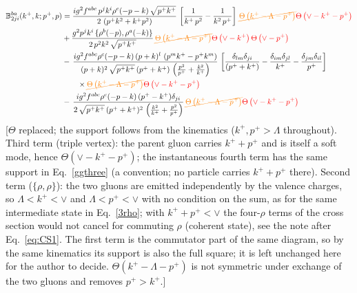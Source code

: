 \documentclass[aps,prd,amsmath,amssymb,nofootinbib]{revtex4-2}
\def\mf#1{\mathbb{#1}}
\numberwithin{equation}{section}
\begin{document}
\begin{align}
    \mf{B}^{ba}_{2ji}(k^{+},k;p^{+},p) & =  \frac{ig^{2}f^{abc}\,p^{j}k^{i}\rho^{c}(-p-k)\, \sqrt{p^{+}k^{+}}}{2\,\left(p^{+}k^{2}+k^{+}p^{2}\right)}\,\left[\frac{1}{k^{+}\,p^{2}} - \frac{1}{k^{2}\,p^{+}}\right]\,{\color{orange}\cancel{\Theta\left(k^{+}-\Lambda-p^{+}\right)}}{\color{red}\Theta\left(\vee-k^{+}-p^{+}\right)}\notag \\ & + \frac{g^{2}p^{j}k^{i}\,\{\rho^{b}(-p),\rho^{a}(-k)\}}{2\,p^{2}k^{2}\, \sqrt{p^{+}k^{+}}}\,{\color{orange}\cancel{\Theta\left(k^{+}-\Lambda-p^{+}\right)}}{\color{red}\Theta\left(\vee-k^{+}\right)\Theta\left(\vee-p^{+}\right)}\notag \\ & -\,\frac{ig^{2}f^{abc}\rho^{c}(-p-k)\,(p+k)^{l}\,\left(p^{m}k^{+}-p^{+}k^{m}\right)}{(p+k)^{2}\,\sqrt{p^{+}k^{+}}\,(p^{+}+k^{+})\,\left(\frac{p^{2}}{p^{+}}+\frac{k^{2}}{k^{+}}\right)}\,\left[\frac{\delta_{lm}\delta_{ji}}{(p^{+}+k^{+})} - \frac{\delta_{im}\delta_{jl}}{k^{+}} - \frac{\delta_{jm}\delta_{il}}{p^{+}}\right]\notag \\ & \qquad\times{\color{orange}\cancel{\Theta\left(k^{+}-\Lambda-p^{+}\right)}}{\color{red}\Theta\left(\vee-k^{+}-p^{+}\right)}\notag \\ & -\,\frac{ig^{2}f^{abc}\rho^{c}(-p-k)\,(p^{+}-k^{+})\delta_{ji}}{2\,\sqrt{p^{+}k^{+}}\,(p^{+}+k^{+})^{2}\,\left(\frac{k^{2}}{k^{+}}+\frac{p^{2}}{p^{+}}\right)}\,{\color{orange}\cancel{\Theta\left(k^{+}-\Lambda-p^{+}\right)}}{\color{red}\Theta\left(\vee-k^{+}-p^{+}\right)}
\end{align} {\color{red}[$\Theta$ replaced; the support follows from the kinematics ($k^+,p^+>\Lambda$ throughout). Third term (triple vertex): the parent gluon carries $k^++p^+$ and is itself a soft mode, hence $\Theta(\vee-k^+-p^+)$; the instantaneous fourth term has the same support in Eq.~\eqref{ggthree} (a convention; no particle carries $k^++p^+$ there). Second term ($\{\rho,\rho\}$): the two gluons are emitted independently by the valence charges, so $\Lambda<k^+<\vee$ and $\Lambda<p^+<\vee$ with no condition on the sum, as for the same intermediate state in Eq.~\eqref{3rho}; with $k^++p^+<\vee$ the four-$\rho$ terms of the cross section would not cancel for commuting $\rho$ (coherent state), see the note after Eq.~\eqref{eq:CS1}. The first term is the commutator part of the same diagram, so by the same kinematics its support is also the full square; it is left unchanged here for the author to decide. $\Theta(k^+-\Lambda-p^+)$ is not symmetric under exchange of the two gluons and removes $p^+>k^+$.]}\par\noindent 
\end{document}
